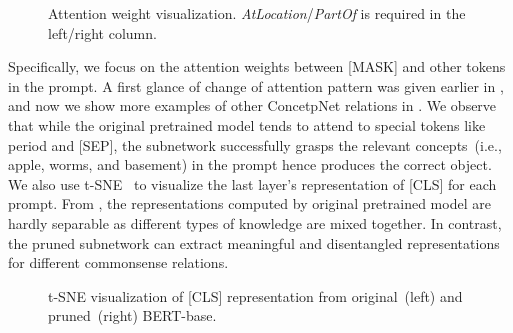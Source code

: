 \begin{figure}[th!]
	\centering
	\caption{Attention weight visualization. \textit{AtLocation}/\textit{PartOf} is required in the left/right column.} \label{fig:attention}
\end{figure}
Specifically, we focus on the attention weights between [MASK] and 
other tokens in the prompt. A first glance of change of attention pattern 
was given earlier in , and now we show more examples of 
other ConcetpNet relations in . We observe that while the original 
pretrained model tends to attend to special tokens like period and [SEP], 
the subnetwork successfully grasps the relevant concepts~(i.e., apple, 
worms, and basement) in the prompt hence produces the correct object. 
We also use t-SNE~\citep{vanDerMaaten2008} to visualize the last layer's 
representation of [CLS] for each prompt. From , the 
representations computed by original pretrained model are hardly separable as 
different types of knowledge are mixed together. In contrast, the pruned 
subnetwork can extract meaningful and disentangled representations for 
different commonsense relations.

\begin{figure}[th!]
	\centering
	\caption{t-SNE visualization of [CLS] representation from original~(left) and pruned~(right) BERT-base.} \label{fig:tsne}
\end{figure}




